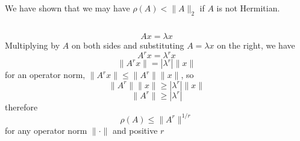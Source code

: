 \documentclass[11pt]{article} %
\begin{document}
We have shown that we may have $\rho(A) < \| A \|_2$ if $A$ is not Hermitian.
\subsection{} %
\begin{equation}
A x = \lambda x
\end{equation}
Multiplying by $A$ on both sides and substituting $A = \lambda x$ on the right, we have
\begin{equation}
A^r x =\lambda^r x
\end{equation}
\begin{equation}
\| A^r x \| = | \lambda^r | \|x\|
\end{equation}
for an operator norm, $ \| A^r x \| \le \|A^r \| \|x\|$, so
\begin{equation}
\|A^r \| \|x\| \ge | \lambda^r | \|x\|
\end{equation}
\begin{equation}
\|A^r \| \ge | \lambda^r |
\end{equation}
therefore
\begin{equation}
\boxed{\rho(A) \le \|A^r \|^{1/r}}
\end{equation}
for any operator norm $\| \cdot \|$ and positive $r$
\end{document}
